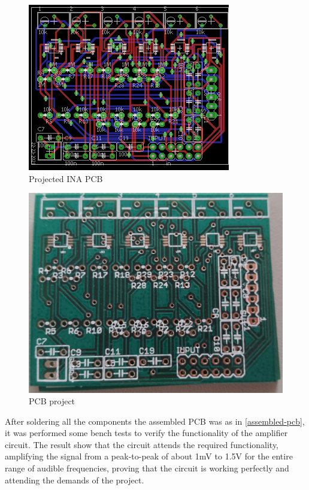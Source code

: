 \begin{figure}[!htpb]
  \centering
  \caption{Projected INA PCB}
  \label{INA-PCB}
  \includegraphics[scale=0.6]{images/INA/PCB}
\end{figure}

\begin{figure}[!htpb]
  \centering
  \caption{PCB project}
  \label{INA-printed}
  \includegraphics[scale=0.1]{images/INA/printed.jpeg}
\end{figure}


After soldering all the components the assembled PCB was as in \autoref{assembled-pcb},
it was performed some bench tests to verify the
functionality of the amplifier circuit. The result show that the circuit attends
the required functionality, amplifying the signal from a peak-to-peak of about 1mV
to 1.5V for the entire range of audible frequencies, proving that the circuit is
working perfectly and attending the demands of the project.

